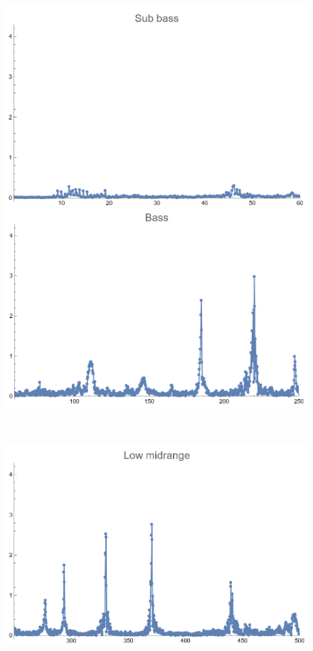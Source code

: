 \documentclass[12pt, letterpaper]{article}
\begin{document}
\begin{figure}[H]
  \centering
  \begin{minipage}{.3\textwidth}
    \centering
    \includegraphics[width=.9\linewidth]{imgs/Cancion1/subbass.png}
  \end{minipage}
  \begin{minipage}{0.03\textwidth}\end{minipage}
  \begin{minipage}{.3\textwidth}
    \centering
    \includegraphics[width=.9\linewidth]{imgs/Cancion1/bass.png}
  \end{minipage} \medskip \\
  \begin{minipage}{.3\textwidth}
    \centering
    \includegraphics[width=.9\linewidth]{imgs/Cancion1/lowmid.png}

\end{minipage}
\end{figure}
\end{document}
